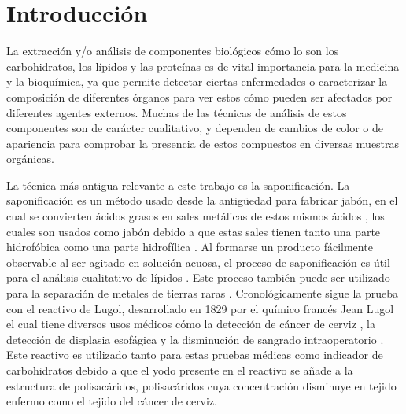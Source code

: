 \documentclass[fleqn,10pt]{SelfArx}
\begin{document}
\flushbottom %

\maketitle %

\thispagestyle{empty} %




\section*{Introducci\'on} %
	La extracción y/o análisis de componentes biológicos cómo lo son los carbohidratos, los lípidos y las proteínas es de vital importancia para la medicina y la bioquímica, ya que permite detectar ciertas enfermedades o caracterizar la composición de diferentes órganos para ver estos cómo pueden ser afectados por diferentes agentes externos. Muchas de las técnicas de análisis de estos componentes son de carácter cualitativo, y dependen de cambios de color o de apariencia para comprobar la presencia de estos compuestos en diversas muestras orgánicas. 
	
	La técnica más antigua relevante a este trabajo es la saponificación. La saponificación es un método usado desde la antigüedad para fabricar jabón, en el cual se convierten ácidos grasos en sales metálicas de estos mismos ácidos \cite{preston1925modern}, los cuales son usados como jabón debido a que estas sales tienen tanto una parte hidrofóbica como una parte hidrofílica \cite{preston1925modern}. Al formarse un producto fácilmente observable al ser agitado en solución acuosa, el proceso de saponificación es útil para el análisis cualitativo de lípidos \cite{souza2017microwave}. Este proceso también puede ser utilizado para la separación de metales de tierras raras \cite{dong2016sustainable}.
	Cronológicamente sigue la prueba con el reactivo de Lugol, desarrollado en 1829 por el químico francés Jean Lugol \cite{sneader2005drug} el cual tiene diversos usos médicos cómo la detección de cáncer de cerviz \cite{novak1937pseudomalignant}, la detección de displasia esofágica \cite{li2018lugol} y la disminución de sangrado intraoperatorio \cite{yilmaz2016effect}. Este reactivo es utilizado tanto para estas pruebas médicas como indicador de carbohidratos debido a que el yodo presente en el reactivo se añade a la estructura de polisacáridos, polisacáridos cuya concentración disminuye en tejido enfermo como el tejido del cáncer de cerviz.
	
\end{document}
